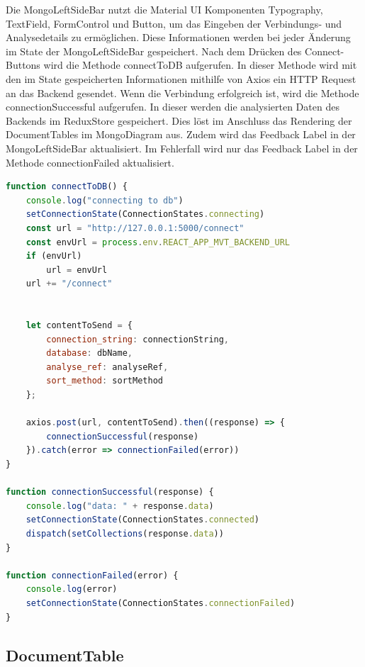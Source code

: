Die  MongoLeftSideBar nutzt die Material UI Komponenten Typography, TextField, FormControl und Button, um das Eingeben der Verbindungs- und Analysedetails zu ermöglichen.
Diese Informationen werden bei jeder Änderung im State der MongoLeftSideBar gespeichert.
Nach dem Drücken des Connect-Buttons wird die Methode connectToDB aufgerufen.
In dieser Methode wird mit den im State gespeicherten Informationen mithilfe von Axios ein HTTP Request an das Backend gesendet.
Wenn die Verbindung erfolgreich ist, wird die Methode connectionSuccessful aufgerufen.
In dieser werden die analysierten Daten des Backends im ReduxStore gespeichert.
Dies löst im Anschluss das Rendering der DocumentTables im MongoDiagram aus.
Zudem wird das Feedback Label in der MongoLeftSideBar aktualisiert.
Im Fehlerfall wird nur das Feedback Label in der Methode connectionFailed aktualisiert.

\begin{lstlisting}[language=JavaScript, caption={MongoLeftSideBar.connectToDB},label={lst:mongo_left_side_bar_connect_to_db}]
function connectToDB() {
    console.log("connecting to db")
    setConnectionState(ConnectionStates.connecting)
    const url = "http://127.0.0.1:5000/connect"
    const envUrl = process.env.REACT_APP_MVT_BACKEND_URL
    if (envUrl)
        url = envUrl
    url += "/connect"


    let contentToSend = {
        connection_string: connectionString,
        database: dbName,
        analyse_ref: analyseRef,
        sort_method: sortMethod
    };

    axios.post(url, contentToSend).then((response) => {
        connectionSuccessful(response)
    }).catch(error => connectionFailed(error))
}

function connectionSuccessful(response) {
    console.log("data: " + response.data)
    setConnectionState(ConnectionStates.connected)
    dispatch(setCollections(response.data))
}

function connectionFailed(error) {
    console.log(error)
    setConnectionState(ConnectionStates.connectionFailed)
}
\end{lstlisting}

\subsection{DocumentTable}
\label{sub:fe_document_table}

